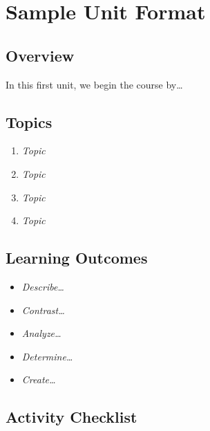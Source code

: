 \documentclass[
]{book}
\providecommand{\tightlist}{%
  \setlength{\itemsep}{0pt}\setlength{\parskip}{0pt}}
\begin{document}
\hypertarget{sample-unit-format}{%
\chapter*{Sample Unit Format}\label{sample-unit-format}}

\hypertarget{overview-3}{%
\section*{Overview}\label{overview-3}}

In this first unit, we begin the course by\ldots{}

\hypertarget{topics-3}{%
\section*{Topics}\label{topics-3}}

\begin{enumerate}
\def\labelenumi{\arabic{enumi}.}
\tightlist
\item
  \emph{Topic}\\
\item
  \emph{Topic}\\
\item
  \emph{Topic}\\
\item
  \emph{Topic}
\end{enumerate}

\hypertarget{learning-outcomes-3}{%
\section*{Learning Outcomes}\label{learning-outcomes-3}}

\begin{itemize}
\tightlist
\item
  \emph{Describe\ldots{}}
\item
  \emph{Contrast\ldots{}}
\item
  \emph{Analyze\ldots{}}
\item
  \emph{Determine\ldots{}}
\item
  \emph{Create\ldots{}}
\end{itemize}

\hypertarget{activity-checklist-3}{%
\section*{Activity Checklist}\label{activity-checklist-3}}
\end{document}
